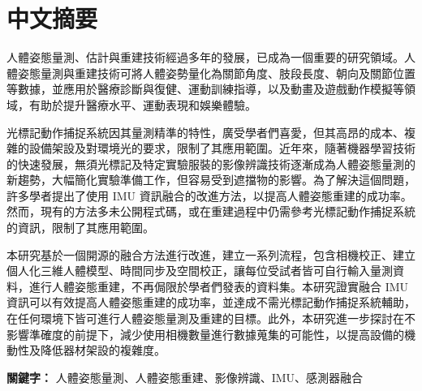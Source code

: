 \chapter{中文摘要}
\fontsize{12pt}{18pt}\selectfont

人體姿態量測、估計與重建技術經過多年的發展，已成為一個重要的研究領域。人體姿態量測與重建技術可將人體姿勢量化為關節角度、肢段長度、朝向及關節位置等數據，並應用於醫療診斷與復健、運動訓練指導，以及動畫及遊戲動作模擬等領域，有助於提升醫療水平、運動表現和娛樂體驗。

光標記動作捕捉系統因其量測精準的特性，廣受學者們喜愛，但其高昂的成本、複雜的設備架設及對環境光的要求，限制了其應用範圍。近年來，隨著機器學習技術的快速發展，無須光標記及特定實驗服裝的影像辨識技術逐漸成為人體姿態量測的新趨勢，大幅簡化實驗準備工作，但容易受到遮擋物的影響。為了解決這個問題，許多學者提出了使用 IMU 資訊融合的改進方法，以提高人體姿態重建的成功率。然而，現有的方法多未公開程式碼，或在重建過程中仍需參考光標記動作捕捉系統的資訊，限制了其應用範圍。

本研究基於一個開源的融合方法進行改進，建立一系列流程，包含相機校正、建立個人化三維人體模型、時間同步及空間校正，讓每位受試者皆可自行輸入量測資料，進行人體姿態重建，不再侷限於學者們發表的資料集。本研究證實融合 IMU 資訊可以有效提高人體姿態重建的成功率，並達成不需光標記動作捕捉系統輔助，在任何環境下皆可進行人體姿態量測及重建的目標。此外，本研究進一步探討在不影響準確度的前提下，減少使用相機數量進行數據蒐集的可能性，以提高設備的機動性及降低器材架設的複雜度。

\bigskip
\textbf{關鍵字：} 人體姿態量測、人體姿態重建、影像辨識、IMU、感測器融合

